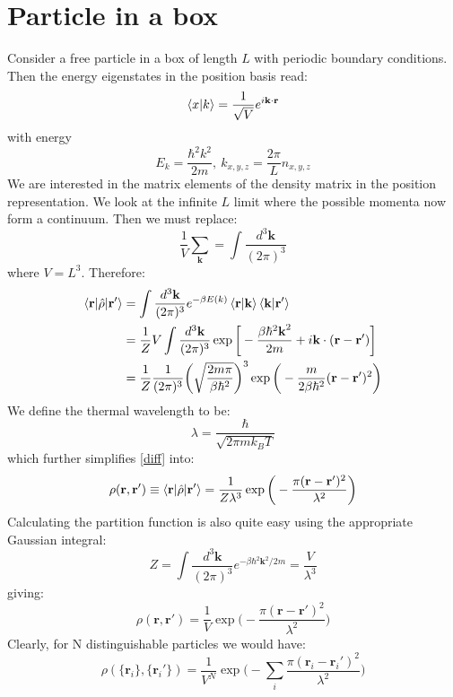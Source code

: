 \documentclass[a4paper,11pt,oneside]{book}
\begin{document}
\section{Particle in a box}
Consider a free particle in a box of length $L$ with periodic boundary conditions. Then the energy eigenstates in the position basis read:
\begin{equation}
    \braket{x|k} = \frac{1}{\sqrt{V}} e^{i \textbf{k}\cdot \textbf{r}}
\end{equation}
with energy
\begin{equation}
    E_k = \frac{\hbar^2 k^2}{2m}, \ k_{x,y,z}=\frac{2\pi}{L} n_{x,y,z}
\end{equation}
We are interested in the matrix elements of the density matrix in the position representation. We look at the infinite $L$ limit where the possible momenta now form a continuum. Then we must replace:
\begin{equation}
    \frac{1}{V}\sum_\textbf{k} = \int \frac{d^3\textbf{k}}{(2\pi)^3}
\end{equation}
where $V=L^3$. Therefore:
\begin{align}
    \braket{\textbf{r}|\hat{\rho}|\textbf{r}'} &=\int \frac{d^3\textbf{k}}{(2\pi)^3} e^{-\beta E(k)} \braket{\textbf{r}|\textbf{k}}\braket{\textbf{k}|\textbf{r}'} \\
    &=\frac{1}{Z} V \int \frac{d^3\textbf{k}}{(2\pi)^3} \exp \bigg[-\frac{\beta \hbar^2 \textbf{k}^2}{2m}+i\textbf{k}\cdot (\textbf{r}-\textbf{r}')\bigg]\\
    &=\frac{1}{Z} \frac{1}{(2\pi)^3} \bigg(\sqrt{\frac{2m \pi}{\beta \hbar^2}}\bigg)^3 \exp \bigg(-\frac{m}{2\beta \hbar^2}(\textbf{r}-\textbf{r}')^2\bigg) \label{diff}
\end{align}
We define the thermal wavelength to be:
\begin{equation}
    \boxed{\lambda = \frac{\hbar}{\sqrt{2\pi m k_B T}}}
\end{equation}
which further simplifies \eqref{diff} into:
\begin{equation}
   \rho(\textbf{r},\textbf{r}')\equiv \braket{\textbf{r}|\hat{\rho}|\textbf{r}'} = \frac{1}{Z \lambda^3} \exp \bigg(-\frac{\pi(\textbf{r}-\textbf{r}')^2}{\lambda^2}\bigg)
\end{equation}
Calculating the partition function is also quite easy using the appropriate Gaussian integral:
\begin{equation}
    Z = \int \frac{d^3\textbf{k}}{(2\pi)^3} e^{-\beta \hbar^2 \textbf{k}^2/2m} = \frac{V}{\lambda^3}
\end{equation}
giving:
\begin{equation}
 \boxed{ \rho(\textbf{r},\textbf{r}') = \frac{1}{V} \exp \bigg(-\frac{\pi(\textbf{r}-\textbf{r}')^2}{\lambda^2}\bigg)}
\end{equation}
Clearly, for N distinguishable particles we would have:
\begin{equation} \rho(\{\textbf{r}_i\},\{\textbf{r}_i'\}) = \frac{1}{V^N} \exp \bigg(-\sum_i\frac{\pi(\textbf{r}_i-\textbf{r}_i')^2}{\lambda^2}\bigg)
\end{equation}
\end{document}
